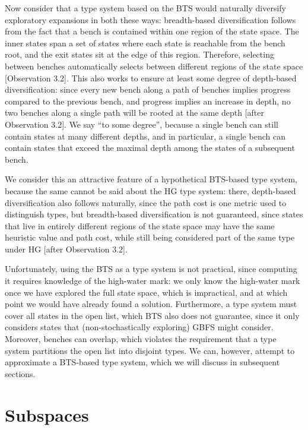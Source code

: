 Now consider that a type system based on the BTS would naturally diversify exploratory expansions in both these ways: breadth-based diversification follows from the fact that a bench is contained within one region of the state space. The inner states span a set of states where each state is reachable from the bench root, and the exit states sit at the edge of this region. Therefore, selecting between benches automatically selects between different regions of the state space [Observation 3.2]. This also works to ensure at least some degree of depth-based diversification: since every new bench along a path of benches implies progress compared to the previous bench, and progress implies an increase in depth, no two benches along a single path will be rooted at the same depth [after Observation 3.2]. We say ``to some degree'', because a single bench can still contain states at many different depths, and in particular, a single bench can contain states that exceed the maximal depth among the states of a subsequent bench.

We consider this an attractive feature of a hypothetical BTS-based type system, because the same cannot be said about the HG type system: there, depth-based diversification also follows naturally, since the path cost is one metric used to distinguish types, but breadth-based diversification is not guaranteed, since states that live in entirely different regions of the state space may have the same heuristic value and path cost, while still being considered part of the same type under HG [after Observation 3.2].

Unfortunately, using the BTS as a type system is not practical, since computing it requires knowledge of the high-water mark: we only know the high-water mark once we have explored the full state space, which is impractical, and at which point we would have already found a solution. Furthermore, a type system must cover all states in the open list, which BTS also does not guarantee, since it only considers states that (non-stochastically exploring) GBFS might consider. Moreover, benches can overlap, which violates the requirement that a type system partitions the open list into disjoint types. We can, however, attempt to approximate a BTS-based type system, which we will discuss in subsequent sections.

\section{Subspaces}


